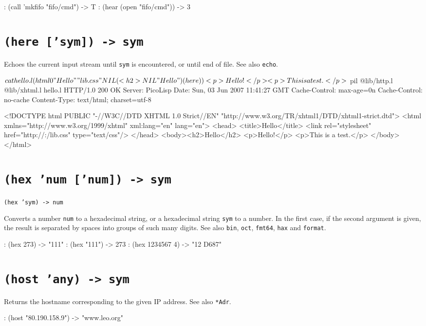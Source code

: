 \begin{wideverbatim}
: (call 'mkfifo "fifo/cmd")
-> T
: (hear (open "fifo/cmd"))
-> 3
\end{wideverbatim}

 
\section*{\texttt{(here ['sym]) -> sym}}
\label{sec:func-ref-H-(here ['sym]) -> sym}


Echoes the current input stream until \texttt{sym} is encountered, or until end
of file. See also \texttt{echo}.


\begin{wideverbatim}
$ cat hello.l
(html 0 "Hello" "lib.css" NIL
   (<h2> NIL "Hello")
   (here) )
<p>Hello!</p>
<p>This is a test.</p>

$ pil @lib/http.l @lib/xhtml.l hello.l
HTTP/1.0 200 OK
Server: PicoLisp
Date: Sun, 03 Jun 2007 11:41:27 GMT
Cache-Control: max-age=0n
Cache-Control: no-cache
Content-Type: text/html; charset=utf-8

<!DOCTYPE html PUBLIC "-//W3C//DTD XHTML 1.0 Strict//EN"
"http://www.w3.org/TR/xhtml1/DTD/xhtml1-strict.dtd">
<html xmlns="http://www.w3.org/1999/xhtml" xml:lang="en" lang="en">
<head>
<title>Hello</title>
<link rel="stylesheet" href="http://:/lib.css" type="text/css"/>
</head>
<body><h2>Hello</h2>
<p>Hello!</p>
<p>This is a test.</p>
</body>
</html>
\end{wideverbatim}

 
\section*{\texttt{(hex 'num ['num]) -> sym}}
\label{sec:func-ref-H-(hex 'num ['num]) -> sym}


\texttt{(hex 'sym) -> num}

Converts a number \texttt{num} to a hexadecimal string, or a hexadecimal string
\texttt{sym} to a number. In the first case, if the second argument is given,
the result is separated by spaces into groups of such many digits. See
also \texttt{bin}, \texttt{oct}, \texttt{fmt64}, \texttt{hax} and \texttt{format}.


\begin{wideverbatim}
: (hex 273)
-> "111"
: (hex "111")
-> 273
: (hex 1234567 4)
-> "12 D687"
\end{wideverbatim}

 
\section*{\texttt{(host 'any) -> sym}}
\label{sec:func-ref-H-(host 'any) -> sym}


Returns the hostname corresponding to the given IP address. See also
\texttt{*Adr}.


\begin{wideverbatim}
: (host "80.190.158.9")
-> "www.leo.org"
\end{wideverbatim}




% 
